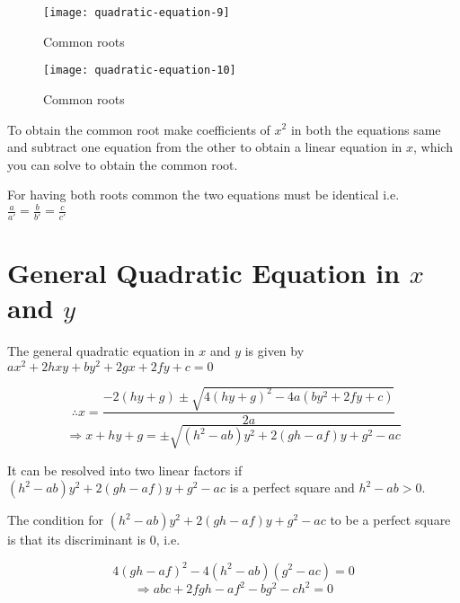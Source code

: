 \begin{figure}[H]
  \begin{center}
    \texttt{[image: quadratic-equation-9]}
    \caption{Common roots}
    \label{fig:9}
  \end{center}
\end{figure}

\begin{figure}[H]
  \begin{center}
    \texttt{[image: quadratic-equation-10]}
    \caption{Common roots}
    \label{fig:10}
  \end{center}
\end{figure}

To obtain the common root make coefficients of $x^2$ in both the equations same and subtract one equation from the other to obtain
a linear equation in $x$, which you can solve to obtain the common root.

For having both roots common the two equations must be identical i.e. $\frac{a}{a'} = \frac{b}{b'} = \frac{c}{c'}$

\section{General Quadratic Equation in $x$ and $y$}
The general quadratic equation in $x$ and $y$ is given by $ax^2 + 2hxy + by^2 + 2gx + 2fy + c = 0$

$$\therefore x = \frac{-2(hy + g)\pm\sqrt{4(hy + g)^2 - 4a(by^2 + 2fy + c)}}{2a}$$
$$\Rightarrow x + hy + g = \pm \sqrt{(h^2 - ab)y^2 + 2(gh - af)y + g^2 - ac}$$

It can be resolved into two linear factors if $(h^2 - ab)y^2 + 2(gh - af)y + g^2 - ac$ is a perfect square and $h^2 - ab > 0$.

The condition for $(h^2 - ab)y^2 + 2(gh - af)y + g^2 - ac$ to be a perfect square is that its discriminant is $0$, i.e.

$$4(gh - af)^2 - 4(h^2 - ab)(g^2 - ac) = 0$$
$$\Rightarrow abc + 2fgh - af^2 - bg^2 - ch^2 = 0$$
